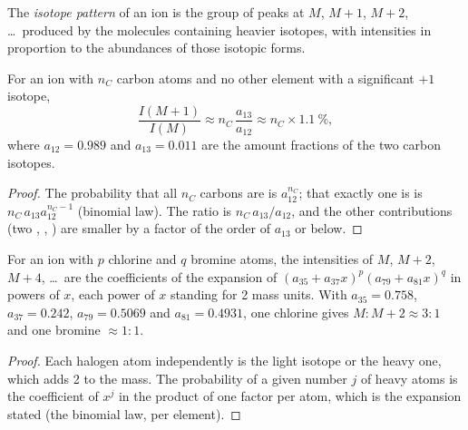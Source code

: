 \begin{definition}\label{def:b2:mass-spec-atomic:isotope-pattern}
The \emph{isotope pattern} of an ion is the group of peaks at $M$, $M+1$,
$M+2$, \dots\ produced by the molecules containing heavier isotopes, with intensities in proportion to
the abundances of those isotopic forms.
\end{definition}

\begin{proposition}\label{prop:b2:mass-spec-atomic:m-plus-one}
For an ion with $n_C$ carbon atoms and no other element with a significant $+1$ isotope,
\begin{equation*}
\frac{I(M+1)}{I(M)} \approx n_C\,\frac{a_{13}}{a_{12}} \approx n_C \times 1.1~\%,
\end{equation*}
where $a_{12} = 0.989$ and $a_{13} = 0.011$ are the amount fractions of the two carbon isotopes.
\end{proposition}

\begin{proof}
The probability that all $n_C$ carbons are  is $a_{12}^{n_C}$; that exactly one is
 is $n_C\,a_{13}a_{12}^{n_C - 1}$ (binomial law). The ratio is $n_C\,a_{13}/a_{12}$, and the
other contributions (two , , ) are smaller by a factor of the order of
$a_{13}$ or below.
\end{proof}

\begin{proposition}\label{prop:b2:mass-spec-atomic:halogen-patterns}
For an ion with $p$ chlorine and $q$ bromine atoms, the intensities of $M$, $M+2$, $M+4$, \dots\ are
the coefficients of the expansion of $(a_{35} + a_{37}x)^p(a_{79} + a_{81}x)^q$ in powers of $x$, each
power of $x$ standing for 2 mass units. With $a_{35} = 0.758$, $a_{37} = 0.242$, $a_{79} = 0.5069$ and
$a_{81} = 0.4931$, one chlorine gives $M : M+2 \approx 3 : 1$ and one bromine $\approx 1 : 1$.
\end{proposition}

\begin{proof}
Each halogen atom independently is the light isotope or the heavy one, which adds 2 to the mass. The
probability of a given number $j$ of heavy atoms is the coefficient of $x^j$ in the product of one factor
per atom, which is the expansion stated (the binomial law, per element).
\end{proof}

